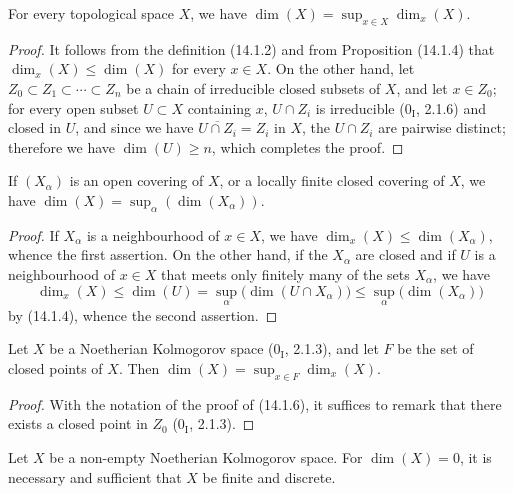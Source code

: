 \begin{proposition}[14.1.6]
\label{0.14.1.6}
For every topological space $X$, we have
$\dim(X)=\sup_{x\in X}\dim_x(X)$.
\end{proposition}

\begin{proof}
It follows from the definition (14.1.2) and from Proposition (14.1.4) that
$\dim_x(X)\leq\dim(X)$ for every $x\in X$. On the other hand, let
$Z_0\subset Z_1\subset\cdots\subset Z_n$ be a chain of irreducible closed
subsets of $X$, and let $x\in Z_0$; for every open subset $U\subset X$
containing $x$, $U\cap Z_i$ is irreducible ($0_{\mathrm I}$, 2.1.6) and
closed in $U$, and since we have $\overline{U\cap Z_i}=Z_i$ in $X$, the
$U\cap Z_i$ are pairwise distinct; therefore we have $\dim(U)\geq n$, which
completes the proof.
\end{proof}

\begin{corollary}[14.1.7]
\label{0.14.1.7}
If $(X_\alpha)$ is an open covering of $X$, or a locally finite closed
covering of $X$, we have
$\dim(X)=\sup_\alpha(\dim(X_\alpha))$.
\end{corollary}

\begin{proof}
If $X_\alpha$ is a neighbourhood of $x\in X$, we have
$\dim_x(X)\leq\dim(X_\alpha)$, whence the first assertion. On the other hand, if
the $X_\alpha$ are closed and if $U$ is a neighbourhood of $x\in X$ that
meets only finitely many of the sets $X_\alpha$, we have
\[
  \dim_x(X)\leq\dim(U)=\sup_\alpha\bigl(\dim(U\cap X_\alpha)\bigr)
  \leq\sup_\alpha\bigl(\dim(X_\alpha)\bigr)
\]
by (14.1.4), whence the second assertion.
\end{proof}

\begin{corollary}[14.1.8]
\label{0.14.1.8}
Let $X$ be a Noetherian Kolmogorov space ($0_{\mathrm I}$, 2.1.3), and
let $F$ be the set of closed points of $X$. Then
$\dim(X)=\sup_{x\in F}\dim_x(X)$.
\end{corollary}

\begin{proof}
With the notation of the proof of (14.1.6), it suffices to remark
that there exists a closed point in $Z_0$ ($0_{\mathrm I}$, 2.1.3).
\end{proof}

\begin{proposition}[14.1.9]
\label{0.14.1.9}
Let $X$ be a non-empty Noetherian Kolmogorov space. For
$\dim(X)=0$, it is necessary and sufficient that $X$ be finite and discrete.
\end{proposition}

